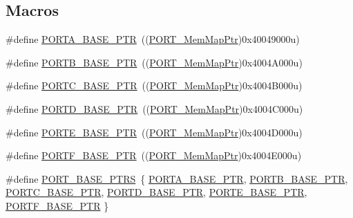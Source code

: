 \subsection*{Macros}
\begin{DoxyCompactItemize}
\item 
\#define \hyperlink{group___p_o_r_t___peripheral_gaa18ec7594fe603225220ec6eda4a19ce}{P\+O\+R\+T\+A\+\_\+\+B\+A\+S\+E\+\_\+\+P\+T\+R}~((\hyperlink{group___p_o_r_t___peripheral_ga0e26bafb7c17808f90278627bcbcaf8c}{P\+O\+R\+T\+\_\+\+Mem\+Map\+Ptr})0x40049000u)
\item 
\#define \hyperlink{group___p_o_r_t___peripheral_ga585b4782d1ceb44492289af0019480f9}{P\+O\+R\+T\+B\+\_\+\+B\+A\+S\+E\+\_\+\+P\+T\+R}~((\hyperlink{group___p_o_r_t___peripheral_ga0e26bafb7c17808f90278627bcbcaf8c}{P\+O\+R\+T\+\_\+\+Mem\+Map\+Ptr})0x4004\+A000u)
\item 
\#define \hyperlink{group___p_o_r_t___peripheral_ga03c740cdda17711afafc932723871474}{P\+O\+R\+T\+C\+\_\+\+B\+A\+S\+E\+\_\+\+P\+T\+R}~((\hyperlink{group___p_o_r_t___peripheral_ga0e26bafb7c17808f90278627bcbcaf8c}{P\+O\+R\+T\+\_\+\+Mem\+Map\+Ptr})0x4004\+B000u)
\item 
\#define \hyperlink{group___p_o_r_t___peripheral_ga7f5a263751543810ebfdbde278383276}{P\+O\+R\+T\+D\+\_\+\+B\+A\+S\+E\+\_\+\+P\+T\+R}~((\hyperlink{group___p_o_r_t___peripheral_ga0e26bafb7c17808f90278627bcbcaf8c}{P\+O\+R\+T\+\_\+\+Mem\+Map\+Ptr})0x4004\+C000u)
\item 
\#define \hyperlink{group___p_o_r_t___peripheral_gab166fe285bbb15b52de610f408fe25d3}{P\+O\+R\+T\+E\+\_\+\+B\+A\+S\+E\+\_\+\+P\+T\+R}~((\hyperlink{group___p_o_r_t___peripheral_ga0e26bafb7c17808f90278627bcbcaf8c}{P\+O\+R\+T\+\_\+\+Mem\+Map\+Ptr})0x4004\+D000u)
\item 
\#define \hyperlink{group___p_o_r_t___peripheral_gadda5d5c0c6f7d718ac2ea336aea4f905}{P\+O\+R\+T\+F\+\_\+\+B\+A\+S\+E\+\_\+\+P\+T\+R}~((\hyperlink{group___p_o_r_t___peripheral_ga0e26bafb7c17808f90278627bcbcaf8c}{P\+O\+R\+T\+\_\+\+Mem\+Map\+Ptr})0x4004\+E000u)
\item 
\#define \hyperlink{group___p_o_r_t___peripheral_ga54ff5179f8acaef2e1683cedfc0ef453}{P\+O\+R\+T\+\_\+\+B\+A\+S\+E\+\_\+\+P\+T\+R\+S}~\{ \hyperlink{group___p_o_r_t___peripheral_gaa18ec7594fe603225220ec6eda4a19ce}{P\+O\+R\+T\+A\+\_\+\+B\+A\+S\+E\+\_\+\+P\+T\+R}, \hyperlink{group___p_o_r_t___peripheral_ga585b4782d1ceb44492289af0019480f9}{P\+O\+R\+T\+B\+\_\+\+B\+A\+S\+E\+\_\+\+P\+T\+R}, \hyperlink{group___p_o_r_t___peripheral_ga03c740cdda17711afafc932723871474}{P\+O\+R\+T\+C\+\_\+\+B\+A\+S\+E\+\_\+\+P\+T\+R}, \hyperlink{group___p_o_r_t___peripheral_ga7f5a263751543810ebfdbde278383276}{P\+O\+R\+T\+D\+\_\+\+B\+A\+S\+E\+\_\+\+P\+T\+R}, \hyperlink{group___p_o_r_t___peripheral_gab166fe285bbb15b52de610f408fe25d3}{P\+O\+R\+T\+E\+\_\+\+B\+A\+S\+E\+\_\+\+P\+T\+R}, \hyperlink{group___p_o_r_t___peripheral_gadda5d5c0c6f7d718ac2ea336aea4f905}{P\+O\+R\+T\+F\+\_\+\+B\+A\+S\+E\+\_\+\+P\+T\+R} \}
\end{DoxyCompactItemize}

